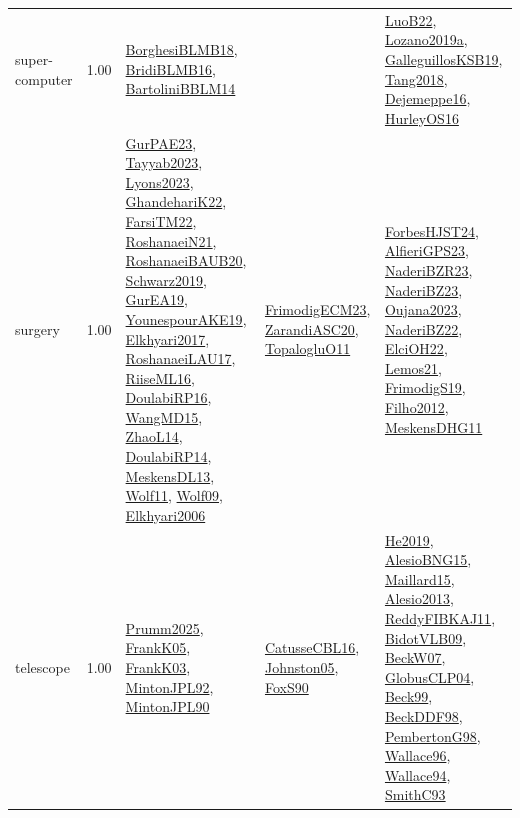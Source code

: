 {\begin{longtable}{p{3cm}r>{\raggedright\arraybackslash}p{6cm}>{\raggedright\arraybackslash}p{6cm}>{\raggedright\arraybackslash}p{8cm}}
\index{super-computer}\index{ApplicationAreas!super-computer}super-computer &  1.00 & \hyperref[detail:BorghesiBLMB18]{BorghesiBLMB18}, \hyperref[detail:BridiBLMB16]{BridiBLMB16}, \hyperref[detail:BartoliniBBLM14]{BartoliniBBLM14} &  & \hyperref[detail:LuoB22]{LuoB22}, \hyperref[detail:Lozano2019a]{Lozano2019a}, \hyperref[detail:GalleguillosKSB19]{GalleguillosKSB19}, \hyperref[detail:Tang2018]{Tang2018}, \hyperref[detail:Dejemeppe16]{Dejemeppe16}, \hyperref[detail:HurleyOS16]{HurleyOS16}\\
\index{surgery}\index{ApplicationAreas!surgery}surgery &  1.00 & \hyperref[detail:GurPAE23]{GurPAE23}, \hyperref[detail:Tayyab2023]{Tayyab2023}, \hyperref[detail:Lyons2023]{Lyons2023}, \hyperref[detail:GhandehariK22]{GhandehariK22}, \hyperref[detail:FarsiTM22]{FarsiTM22}, \hyperref[detail:RoshanaeiN21]{RoshanaeiN21}, \hyperref[detail:RoshanaeiBAUB20]{RoshanaeiBAUB20}, \hyperref[detail:Schwarz2019]{Schwarz2019}, \hyperref[detail:GurEA19]{GurEA19}, \hyperref[detail:YounespourAKE19]{YounespourAKE19}, \hyperref[detail:Elkhyari2017]{Elkhyari2017}, \hyperref[detail:RoshanaeiLAU17]{RoshanaeiLAU17}, \hyperref[detail:RiiseML16]{RiiseML16}, \hyperref[detail:DoulabiRP16]{DoulabiRP16}, \hyperref[detail:WangMD15]{WangMD15}, \hyperref[detail:ZhaoL14]{ZhaoL14}, \hyperref[detail:DoulabiRP14]{DoulabiRP14}, \hyperref[detail:MeskensDL13]{MeskensDL13}, \hyperref[detail:Wolf11]{Wolf11}, \hyperref[detail:Wolf09]{Wolf09}, \hyperref[detail:Elkhyari2006]{Elkhyari2006} & \hyperref[detail:FrimodigECM23]{FrimodigECM23}, \hyperref[detail:ZarandiASC20]{ZarandiASC20}, \hyperref[detail:TopalogluO11]{TopalogluO11} & \hyperref[detail:ForbesHJST24]{ForbesHJST24}, \hyperref[detail:AlfieriGPS23]{AlfieriGPS23}, \hyperref[detail:NaderiBZR23]{NaderiBZR23}, \hyperref[detail:NaderiBZ23]{NaderiBZ23}, \hyperref[detail:Oujana2023]{Oujana2023}, \hyperref[detail:NaderiBZ22]{NaderiBZ22}, \hyperref[detail:ElciOH22]{ElciOH22}, \hyperref[detail:Lemos21]{Lemos21}, \hyperref[detail:FrimodigS19]{FrimodigS19}, \hyperref[detail:Filho2012]{Filho2012}, \hyperref[detail:MeskensDHG11]{MeskensDHG11}\\
\index{telescope}\index{ApplicationAreas!telescope}telescope &  1.00 & \hyperref[detail:Prumm2025]{Prumm2025}, \hyperref[detail:FrankK05]{FrankK05}, \hyperref[detail:FrankK03]{FrankK03}, \hyperref[detail:MintonJPL92]{MintonJPL92}, \hyperref[detail:MintonJPL90]{MintonJPL90} & \hyperref[detail:CatusseCBL16]{CatusseCBL16}, \hyperref[detail:Johnston05]{Johnston05}, \hyperref[detail:FoxS90]{FoxS90} & \hyperref[detail:He2019]{He2019}, \hyperref[detail:AlesioBNG15]{AlesioBNG15}, \hyperref[detail:Maillard15]{Maillard15}, \hyperref[detail:Alesio2013]{Alesio2013}, \hyperref[detail:ReddyFIBKAJ11]{ReddyFIBKAJ11}, \hyperref[detail:BidotVLB09]{BidotVLB09}, \hyperref[detail:BeckW07]{BeckW07}, \hyperref[detail:GlobusCLP04]{GlobusCLP04}, \hyperref[detail:Beck99]{Beck99}, \hyperref[detail:BeckDDF98]{BeckDDF98}, \hyperref[detail:PembertonG98]{PembertonG98}, \hyperref[detail:Wallace96]{Wallace96}, \hyperref[detail:Wallace94]{Wallace94}, \hyperref[detail:SmithC93]{SmithC93}\\

\end{longtable}}
